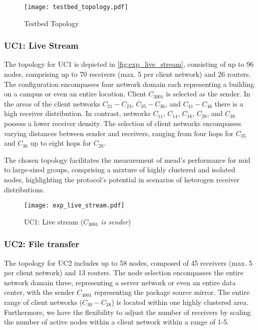 \begin{figure}
    \begin{center}
        \texttt{[image: testbed\_topology.pdf]}
    \end{center}
    \caption{Testbed Topology}
    \label{fig:topology}
\end{figure}




\subsubsection{UC1: Live Stream} %
\label{par:impl UC1: Live Stream}
The topology for UC1 is depicted in \autoref{fig:exp_live_stream}, consisting of
    up to 96 nodes, comprising up to 70 receivers (max. 5 per client network) and
    26 routers.
The configuration encompasses four network domain each representing a building
    on a campus or even an entire location.
Client $C_{3001}$ is selected as the sender.
In the areas of the client networks $C_{21}-C_{23}$, $C_{35}-C_{36}$, and
    $C_{41}-C_{46}$ there is a high receiver distribution.
In contrast, networks $C_{11}$, $C_{14}$, $C_{16}$, $C_{28}$, and $C_38$
    possess a lower receiver density.
The selection of client networks encompasses varying distances between sender
    and receivers, ranging from four hops for $C_{35}$ and $C_{36}$ up to eight
    hops for $C_{28}$.

The chosen topology facilitates the measurement of \gls{mead}'s performance for
    mid to large-sized groups, comprising a mixture of highly clustered and
    isolated nodes, highlighting the protocol's potential in scenarios of
    heterogen receiver distributions.

\begin{figure}
    \begin{center}
        \texttt{[image: exp\_live\_stream.pdf]}
    \end{center}
    \caption[UC1: Live stream]{UC1: Live stream ($C_{3001}$ \textit{is sender})}
    \label{fig:exp_live_stream}
\end{figure}


\subsubsection{UC2: File transfer} %
\label{par:implEX2: File transfer}
The topology for UC2 includes up to 58 nodes, composed of 45 receivers (max. 5
    per client network) and 13 routers.
The node selection encompasses the entire network domain three, representing
    a server network or even an entire data center, with the sender $C_{4001}$
    representing the package source mirror. 
The entire range of client networks ($C_{30}-C_{38}$) is located within one
    highly clustered area.
Furthermore, we have the flexibility to adjust the number of receivers by
    scaling the number of active nodes within a client network within a range
    of 1-5.

